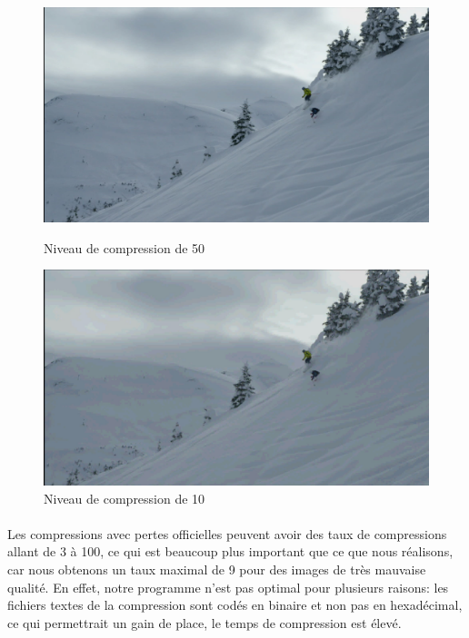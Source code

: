 \documentclass[12pt]{article}
\begin{document}
\begin{figure}[h]
    \begin{minipage}[c]{.46\linewidth}
        \centering
        \includegraphics[scale=0.1]{skilatex50}
        \caption{Niveau de compression de 50}
    \end{minipage}
    \hfill%
    \begin{minipage}[c]{.46\linewidth}
        \centering
        \includegraphics[scale=0.1]{skilatex10}
        \caption{Niveau de compression de 10}
    \end{minipage}
\end{figure}
\paragraph{}
Les compressions avec pertes officielles peuvent avoir des taux de compressions allant de 3 à 100, ce qui est beaucoup plus important que ce que nous réalisons, car nous obtenons un taux maximal de 9 pour des images de très mauvaise qualité. En effet, notre programme n'est pas optimal pour plusieurs raisons: les fichiers textes de la compression sont codés en binaire et non pas en hexadécimal, ce qui permettrait un gain de place, le temps de compression est élevé.
\newpage
\end{document}
